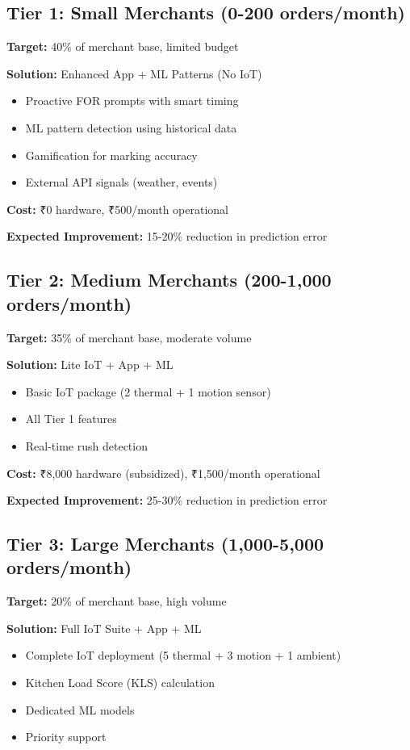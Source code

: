 \documentclass[11pt,a4paper]{article}
\begin{document}
\subsection{Tier 1: Small Merchants (0-200 orders/month)}

\textbf{Target:} 40\% of merchant base, limited budget

\textbf{Solution:} Enhanced App + ML Patterns (No IoT)
\begin{itemize}[leftmargin=*]
    \item Proactive FOR prompts with smart timing
    \item ML pattern detection using historical data
    \item Gamification for marking accuracy
    \item External API signals (weather, events)
\end{itemize}

\textbf{Cost:} ₹0 hardware, ₹500/month operational

\textbf{Expected Improvement:} 15-20\% reduction in prediction error

\subsection{Tier 2: Medium Merchants (200-1,000 orders/month)}

\textbf{Target:} 35\% of merchant base, moderate volume

\textbf{Solution:} Lite IoT + App + ML
\begin{itemize}[leftmargin=*]
    \item Basic IoT package (2 thermal + 1 motion sensor)
    \item All Tier 1 features
    \item Real-time rush detection
\end{itemize}

\textbf{Cost:} ₹8,000 hardware (subsidized), ₹1,500/month operational

\textbf{Expected Improvement:} 25-30\% reduction in prediction error

\subsection{Tier 3: Large Merchants (1,000-5,000 orders/month)}

\textbf{Target:} 20\% of merchant base, high volume

\textbf{Solution:} Full IoT Suite + App + ML
\begin{itemize}[leftmargin=*]
    \item Complete IoT deployment (5 thermal + 3 motion + 1 ambient)
    \item Kitchen Load Score (KLS) calculation
    \item Dedicated ML models
    \item Priority support
\end{itemize}
\end{document}
